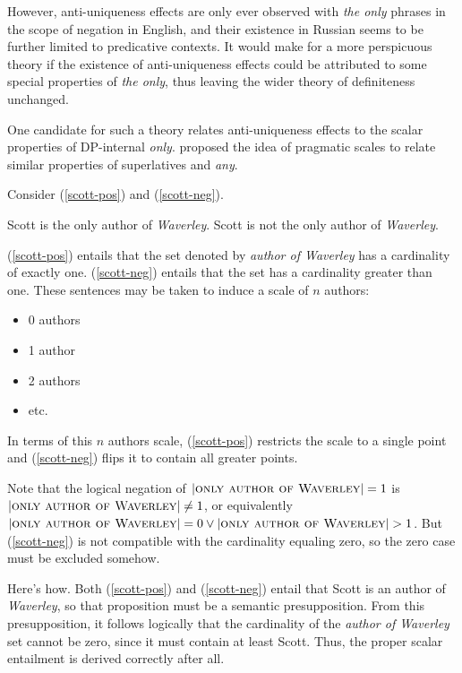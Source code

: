 \documentclass{article}
\begin{document}
However, anti-uniqueness effects are only ever observed with \textit{the only} phrases in the scope of negation in English, and their existence in Russian seems to be further limited to predicative contexts. It would make for a more perspicuous theory if the existence of anti-uniqueness effects could be attributed to some special properties of \textit{the only}, thus leaving the wider theory of definiteness unchanged.

One candidate for such a theory relates anti-uniqueness effects to the scalar properties of DP-internal \textit{only}. \citet{fauconnier75} proposed the idea of pragmatic scales to relate similar properties of superlatives and \textit{any}.


Consider (\ref{scott-pos}) and (\ref{scott-neg}).

\begin{exe}
	\ex \label{scott-pos} Scott is the only author of \textit{Waverley}.
	\ex \label{scott-neg} Scott is not the only author of \textit{Waverley}.
\end{exe}

(\ref{scott-pos}) entails that the set denoted by \textit{author of Waverley} has a cardinality of exactly one. (\ref{scott-neg}) entails that the set has a cardinality greater than one. These sentences may be taken to induce a scale of $n$ authors:

\begin{itemize}
	\item 0 authors
	\item 1 author
	\item 2 authors
	\item etc.
\end{itemize}


In terms of this $n$ authors scale, (\ref{scott-pos}) restricts the scale to a single point and (\ref{scott-neg}) flips it to contain all greater points.

Note that the logical negation of $|\textsc{only author of Waverley}| = 1$ is
$|\textsc{only author of Waverley}| \ne 1$, or equivalently $|\textsc{only author of Waverley}| = 0 \lor |\textsc{only author of Waverley}| > 1$. But (\ref{scott-neg}) is not compatible with the cardinality equaling zero, so the zero case must be excluded somehow.

Here's how. Both (\ref{scott-pos}) and (\ref{scott-neg}) entail that Scott is an author of \textit{Waverley}, so that proposition must be a semantic presupposition. From this presupposition, it follows logically that the cardinality of the \textit{author of Waverley} set cannot be zero, since it must contain at least Scott. Thus, the proper scalar entailment is derived correctly after all.
\end{document}
